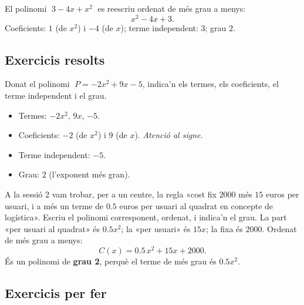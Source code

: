 \begin{exemple}
El polinomi $\;3 - 4x + x^2\;$ es reescriu ordenat de més grau a menys:
\[
x^2 - 4x + 3.
\]
Coeficients: $1$ (de $x^2$) i $-4$ (de $x$); terme independent: $3$; grau $2$.
\end{exemple}

\subsection{Exercicis resolts}

\begin{exresolt}
Donat el polinomi $\;P = -2x^2 + 9x - 5$, indica'n els termes, els coeficients,
el terme independent i el grau.
\solucio
\begin{itemize}[leftmargin=1.4em, itemsep=2pt]
  \item Termes: $-2x^2$, \;$9x$, \;$-5$.
  \item Coeficients: $-2$ (de $x^2$) i $9$ (de $x$). \emph{Atenció al signe.}
  \item Terme independent: $-5$.
  \item Grau: $2$ (l'exponent més gran).
\end{itemize}
\end{exresolt}

\begin{exresolt}
A la sessió 2 vam trobar, per a un centre, la regla «cost fix $\num{2000}$ més
$15$ euros per usuari, i a més un terme de $\num{0,5}$ euros per usuari al quadrat
en concepte de logística». Escriu el polinomi corresponent, ordenat, i indica'n el grau.
\solucio
La part «per usuari al quadrat» és $\num{0,5}x^2$; la «per usuari» és $15x$;
la fixa és $\num{2000}$. Ordenat de més grau a menys:
\[
C(x) = \num{0,5}\,x^2 + 15x + \num{2000}.
\]
És un polinomi de \textbf{grau 2}, perquè el terme de més grau és $\num{0,5}x^2$.
\end{exresolt}

\subsection{Exercicis per fer}

